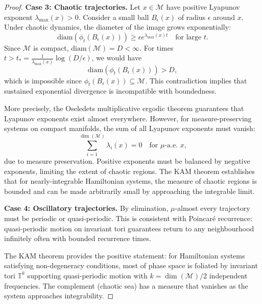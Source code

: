 \documentclass[twocolumn,10pt,a4paper]{article}
\theoremstyle{remark}
\newcommand{\manifold}{\mathcal{M}}
\begin{document}
\begin{proof}
\textbf{Case 3: Chaotic trajectories.} Let $x \in \manifold$ have positive Lyapunov exponent $\lambda_{\max}(x) > 0$. Consider a small ball $B_\epsilon(x)$ of radius $\epsilon$ around $x$. Under chaotic dynamics, the diameter of the image grows exponentially:
\begin{equation}
\text{diam}(\phi_t(B_\epsilon(x))) \geq \epsilon e^{\lambda_{\max}(x) t} \quad \text{for large } t.
\end{equation}
Since $\manifold$ is compact, $\text{diam}(\manifold) = D < \infty$. For times $t > t_* = \frac{1}{\lambda_{\max}(x)} \log(D/\epsilon)$, we would have
\begin{equation}
\text{diam}(\phi_t(B_\epsilon(x))) > D,
\end{equation}
which is impossible since $\phi_t(B_\epsilon(x)) \subseteq \manifold$. This contradiction implies that sustained exponential divergence is incompatible with boundedness.

More precisely, the Oseledets multiplicative ergodic theorem \citep{Oseledets1968} guarantees that Lyapunov exponents exist almost everywhere. However, for measure-preserving systems on compact manifolds, the sum of all Lyapunov exponents must vanish:
\begin{equation}
\sum_{i=1}^{\dim(\manifold)} \lambda_i(x) = 0 \quad \text{for } \mu\text{-a.e. } x,
\end{equation}
due to measure preservation. Positive exponents must be balanced by negative exponents, limiting the extent of chaotic regions. The KAM theorem \citep{Kolmogorov1954, Arnold1963, Moser1962} establishes that for nearly-integrable Hamiltonian systems, the measure of chaotic regions is bounded and can be made arbitrarily small by approaching the integrable limit.

\textbf{Case 4: Oscillatory trajectories.} By elimination, $\mu$-almost every trajectory must be periodic or quasi-periodic. This is consistent with Poincaré recurrence: quasi-periodic motion on invariant tori guarantees return to any neighbourhood infinitely often with bounded recurrence times.

The KAM theorem provides the positive statement: for Hamiltonian systems satisfying non-degeneracy conditions, most of phase space is foliated by invariant tori $\mathbb{T}^k$ supporting quasi-periodic motion with $k = \dim(\manifold)/2$ independent frequencies. The complement (chaotic sea) has a measure that vanishes as the system approaches integrability.
\end{proof}
\end{document}
